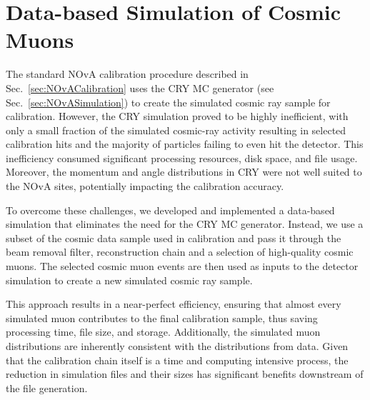
\section{Data-based Simulation of Cosmic Muons}\label{sec:DataBasedSimulation}
The standard \gls{NOvA} calibration procedure described in Sec.~\ref{sec:NOvACalibration} uses the \gls{CRY} \gls{MC} generator (see Sec.~\ref{sec:NOvASimulation}) to create the simulated cosmic ray sample for calibration. However, the \gls{CRY} simulation proved to be highly inefficient, with only a small fraction of the simulated cosmic-ray activity resulting in selected calibration hits and the majority of particles failing to even hit the detector. This inefficiency consumed significant processing resources, disk space, and file usage. Moreover, the momentum and angle distributions in \gls{CRY} were not well suited to the \gls{NOvA} sites, potentially impacting the calibration accuracy.

To overcome these challenges, we developed and implemented a data-based simulation that eliminates the need for the \gls{CRY} \gls{MC} generator. Instead, we use a subset of the cosmic data sample used in calibration and pass it through the beam removal filter, reconstruction chain and a selection of high-quality cosmic muons. The selected cosmic muon events are then used as inputs to the detector simulation to create a new simulated cosmic ray sample.

This approach results in a near-perfect efficiency, ensuring that almost every simulated muon contributes to the final calibration sample, thus saving processing time, file size, and storage. Additionally, the simulated muon distributions are inherently consistent with the distributions from data. Given that the calibration chain itself is a time and computing intensive process, the reduction in simulation files and their sizes has significant benefits downstream of the file generation. 

